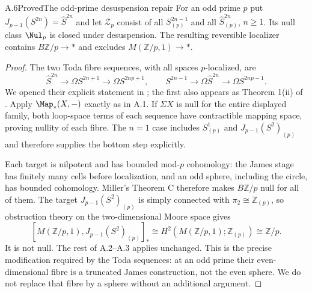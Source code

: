 \begin{claim}{A.6}{Proved}{The odd-prime desuspension repair}
For an odd prime $p$ put $J_{p-1}(S^{2n})=\widehat S^{2n}$ and let $\mathcal Z_p$ consist of all $S^{2n-1}_{(p)}$ and all $\widehat S^{2n}_{(p)}$, $n\geq1$. Its null class $\Nul_p$ is closed under desuspension. The resulting reversible localizer contains $B\mathbb Z/p\to *$ and excludes $M(\mathbb Z/p,1)\to *$.
\end{claim}
\begin{proof}
The two Toda fibre sequences, with all spaces $p$-localized, are
\[
 \widehat S^{2n}\longrightarrow\Omega S^{2n+1}
       \longrightarrow\Omega S^{2np+1},\qquad
 S^{2n-1}\longrightarrow\Omega\widehat S^{2n}
       \longrightarrow\Omega S^{2np-1}.
\]
We opened their explicit statement in \citet[p.~80, item (ii)]{BodigheimerHenn1983}; the first also appears as Theorem 1(ii) of \citet{RavenelEHP2005}. Apply $\Map_*(X,-)$ exactly as in A.1. If $\Sigma X$ is null for the entire displayed family, both loop-space terms of each sequence have contractible mapping space, proving nullity of each fibre. The $n=1$ case includes $S^1_{(p)}$ and $J_{p-1}(S^2)_{(p)}$ and therefore supplies the bottom step explicitly.

Each target is nilpotent and has bounded mod-$p$ cohomology: the James stage has finitely many cells before localization, and an odd sphere, including the circle, has bounded cohomology. Miller's Theorem C therefore makes $B\mathbb Z/p$ null for all of them. The target $J_{p-1}(S^2)_{(p)}$ is simply connected with $\pi_2\cong\mathbb Z_{(p)}$, so obstruction theory on the two-dimensional Moore space gives
\[
 [M(\mathbb Z/p,1),J_{p-1}(S^2)_{(p)}]_*
      \cong H^2(M(\mathbb Z/p,1);\mathbb Z_{(p)})
      \cong\mathbb Z/p.
\]
It is not null. The rest of A.2--A.3 applies unchanged. This is the precise modification required by the Toda sequences: at an odd prime their even-dimensional fibre is a truncated James construction, not the even sphere. We do not replace that fibre by a sphere without an additional argument.
\end{proof}

